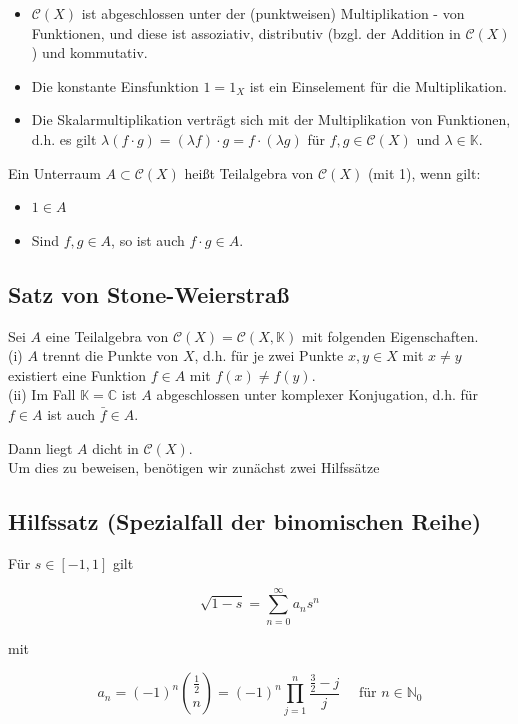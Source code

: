 \documentclass[10pt, letterpaper]{article}
\begin{document}
\begin{itemize}
  \item $\mathcal{C}(X)$ ist abgeschlossen unter der (punktweisen) Multiplikation - von Funktionen, und diese ist assoziativ, distributiv (bzgl. der Addition in $\mathcal{C}(X)$ ) und kommutativ.
  \item Die konstante Einsfunktion $1=1_{X}$ ist ein Einselement für die Multiplikation.
  \item Die Skalarmultiplikation verträgt sich mit der Multiplikation von Funktionen, d.h. es gilt $\lambda(f \cdot g)=(\lambda f) \cdot g=f \cdot(\lambda g)$ für $f, g \in \mathcal{C}(X)$ und $\lambda \in \mathbb{K}$.
\end{itemize}

Ein Unterraum $A \subset \mathcal{C}(X)$ heißt Teilalgebra von $\mathcal{C}(X)$ (mit 1), wenn gilt:

\begin{itemize}
  \item $1 \in A$
  \item Sind $f, g \in A$, so ist auch $f \cdot g \in A$.
\end{itemize}

\subsection*{Satz von Stone-Weierstraß}
Sei $A$ eine Teilalgebra von $\mathcal{C}(X)=\mathcal{C}(X, \mathbb{K})$ mit folgenden Eigenschaften.\\
(i) $A$ trennt die Punkte von $X$, d.h. für je zwei Punkte $x, y \in X$ mit $x \neq y$ existiert eine Funktion $f \in A$ mit $f(x) \neq f(y)$.\\
(ii) Im Fall $\mathbb{K}=\mathbb{C}$ ist $A$ abgeschlossen unter komplexer Konjugation, d.h. für $f \in A$ ist auch $\bar{f} \in A$.

Dann liegt $A$ dicht in $\mathcal{C}(X)$.\\
Um dies zu beweisen, benötigen wir zunächst zwei Hilfssätze

\subsection*{Hilfssatz (Spezialfall der binomischen Reihe)}
Für $s \in[-1,1]$ gilt

$$
\sqrt{1-s}=\sum_{n=0}^{\infty} a_{n} s^{n}
$$

mit

$$
a_{n}=(-1)^{n}\binom{\frac{1}{2}}{n}=(-1)^{n} \prod_{j=1}^{n} \frac{\frac{3}{2}-j}{j} \quad \text { für } n \in \mathbb{N}_{0}
$$
\end{document}
